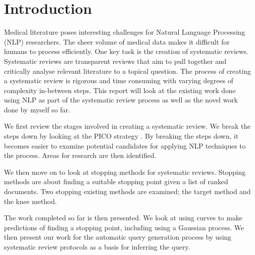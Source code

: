 \chapter{Introduction}

Medical literature poses interesting challenges for Natural Language Processing (NLP) researchers. The sheer volume of medical data makes it difficult for humans to process efficiently. One key task is the creation of systematic reviews. Systematic reviews are transparent reviews that aim to pull together and critically analyse relevant literature to a topical question. The process of creating a systematic review is rigorous and time consuming with varying degrees of complexity in-between steps. This report will look at the existing  work done using NLP as part of the systematic review process as well as the novel work done by myself so far.


We first review the stages involved in creating a systematic review. We break the steps down by looking at the PICO strategy \cite{pico}. By breaking the steps down, it becomes easier to examine potential candidates for applying NLP techniques to the process. Areas for research are then identified.

We then move on to look at stopping methods for systematic reviews. Stopping methods are about finding a suitable stopping point given a list of ranked documents. Two stopping existing methods are examined; the target method and the knee method. 

The work completed so far is then presented. We look at using curves to make predictions of finding a stopping point, including using a Gaussian process. We then present our work for the automatic query generation process by using systematic review protocols as a basis for inferring the query.


